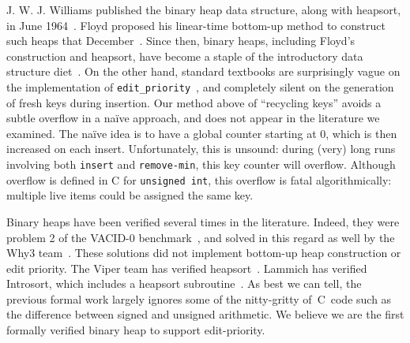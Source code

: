 J. W. J. Williams published the binary heap data structure, along with heapsort, in June 1964~\cite{10.1145/512274.512284}.  Floyd proposed his linear-time bottom-up method to construct such heaps that December~\cite{10.1145/355588.365103}.  Since then, binary heaps, including Floyd's construction and heapsort, have become a staple of the introductory data structure diet~\cite{clrs}.  On the other hand, standard textbooks are surprisingly vague on the implementation of \texttt{edit\_priority}~\cite{clrs,sedgewick,DBLP:books/daglib/0015106}, and completely silent on the generation of fresh keys during insertion.  Our method above of ``recycling keys'' avoids a subtle overflow in a na\"ive approach, and does not appear in the literature we examined.  The na\"ive idea is to have a global counter starting at 0, which is then increased on each insert.  Unfortunately, this is unsound: during (very) long runs involving both \texttt{insert} and \texttt{remove-min}, this key counter will overflow.  Although overflow is defined in C for \texttt{unsigned int}, this overflow is fatal algorithmically: multiple live items could be assigned the same key.


Binary heaps have been verified several times in the literature.  Indeed, they were problem 2 of the VACID-0 benchmark~\cite{Leino10vacid-0:verification}, and solved in this regard as well by the Why3 team~\cite{tafat:binheap}.  These solutions did not implement bottom-up heap construction or edit priority.  The Viper team has verified heapsort~\cite{Muelleremail}.
Lammich has verified Introsort, which includes a heapsort subroutine~\cite{DBLP:conf/cade/Lammich20}.  %
As best we can tell, the previous formal work largely ignores some of the nitty-gritty of~C~code such as the difference between signed and unsigned arithmetic.  We believe we are the first formally verified binary heap to support edit-priority.
